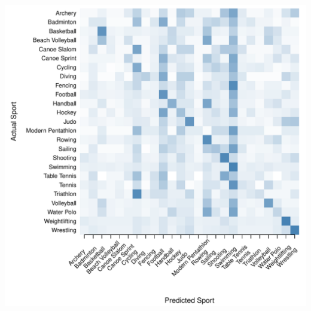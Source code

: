 \documentclass[landscape, paperwidth=42in, paperheight=36in,
fontscale=.35, margin=1in]{baposter}
\begin{document}
\begin{poster}
{\begin{center}
\begin{minipage}{0.45\textwidth}
\begin{center}
      \includegraphics[scale=0.27]{../graphics/sportRF-tst.pdf}
    \end{center}
  \end{minipage}




\end{center}}
\end{poster}
\end{document}
